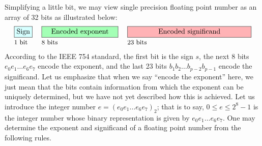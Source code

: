 Simplifying a little bit,
we may view single precision floating point number as an array of 32 bits as illustrated below:
\begin{alignat*}{3}
    &\fcolorbox{black}{lightcyan}{\text{Sign}}
    \hspace{.1cm}
    &&\fcolorbox{black}{nicegreen}{\quad\text{Encoded exponent}\quad}
    \hspace{.1cm}
    &&\fcolorbox{black}{lightred}{\qquad\qquad\text{Encoded significand}\qquad\qquad}\\[-.1cm]
    &\text{\small 1 bit} &&\text{\small 8 bits} &&\text{\small 23 bits}
\end{alignat*}
According to the IEEE 754 standard,
the first bit is the sign $s$,
the next 8 bits $e_0 e_1 \dots e_6 e_7$ encode the exponent,
and the last 23 bits $b_1 b_2 \dots b_{p-2} b_{p-1}$ encode the significand.
Let us emphasize that when we say ``encode the exponent'' here,
we just mean that the bits contain information from which the exponent can be uniquely determined,
but we have not yet described how this is achieved.
Let us introduce the integer number $e = (e_0 e_1 \dots e_6 e_7)_2$;
that is to say, $0 \leq e \leq 2^8 -1$ is the integer number whose binary representation
is given by $e_0 e_1 \dots e_6 e_7$.
One may determine the exponent and significand of a floating point number from the following rules.

